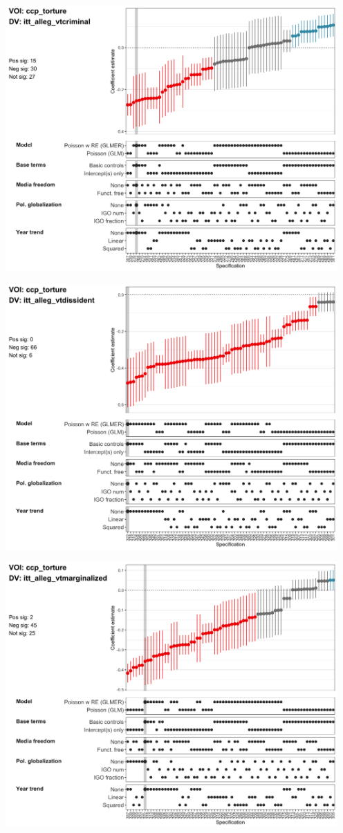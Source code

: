 \documentclass[]{article}
\begin{document}
\includegraphics[height=4in]{../output/figures-robustness/specplot-ccp_torture-itt_alleg_vtcriminal.png}

\includegraphics[height=4in]{../output/figures-robustness/specplot-ccp_torture-itt_alleg_vtdissident.png}

\includegraphics[height=4in]{../output/figures-robustness/specplot-ccp_torture-itt_alleg_vtmarginalized.png}
\end{document}
